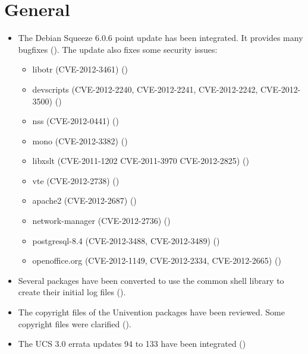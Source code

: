 \newcommand{\ucsUCRV}[1]{Univention Configuration Registry variable \ucsCommand{\ucsBCindex{#1}}}

\section{General}
\begin{itemize}

\item The Debian Squeeze 6.0.6 point update has been integrated. It
  provides many bugfixes (). The update also fixes
  some security issues:

\begin{itemize}
\item libotr (CVE-2012-3461) ()
\item devscripts (CVE-2012-2240,  CVE-2012-2241, CVE-2012-2242, CVE-2012-3500) ()
\item nss (CVE-2012-0441) ()
\item mono (CVE-2012-3382) ()
\item libxslt (CVE-2011-1202 CVE-2011-3970 CVE-2012-2825) ()
\item vte (CVE-2012-2738) ()
\item apache2 (CVE-2012-2687) ()
\item network-manager (CVE-2012-2736) ()
\item postgresql-8.4 (CVE-2012-3488, CVE-2012-3489) ()
\item openoffice.org (CVE-2012-1149, CVE-2012-2334, CVE-2012-2665) ()
\end{itemize}

\item Several packages have been converted to use the common shell
library to create their initial log files ().

\item The copyright files of the Univention packages have been reviewed. Some copyright
files were clarified ().

\item The UCS 3.0 errata updates 94 to 133 have been integrated ()

\end{itemize}


